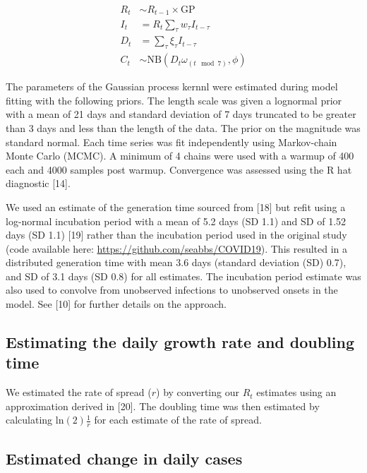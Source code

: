 \documentclass[
]{article}
\begin{document}
\begin{align}
  R_{t} &\sim R_{t-1} \times \mathrm{GP} \\
  I_t &= R_t \sum_\tau w_\tau I_{t - \tau} \\
  D_t &= \sum_\tau \xi_\tau I_{t-\tau} \\ 
  C_t &\sim \mathrm{NB}(D_t \omega_{(t \mod 7)} , \phi)
\end{align}

The parameters of the Gaussian process kernnl were estimated during
model fitting with the following priors. The length scale was given a
lognormal prior with a mean of 21 days and standard deviation of 7 days
truncated to be greater than 3 days and less than the length of the
data. The prior on the magnitude was standard normal. Each time series
was fit independently using Markov-chain Monte Carlo (MCMC). A minimum
of 4 chains were used with a warmup of 400 each and 4000 samples post
warmup. Convergence was assessed using the R hat diagnostic {[}14{]}.

We used an estimate of the generation time sourced from {[}18{]} but
refit using a log-normal incubation period with a mean of 5.2 days (SD
1.1) and SD of 1.52 days (SD 1.1) {[}19{]} rather than the incubation
period used in the original study (code available here:
\url{https://github.com/seabbs/COVID19}). This resulted in a distributed
generation time with mean 3.6 days (standard deviation (SD) 0.7), and SD
of 3.1 days (SD 0.8) for all estimates. The incubation period estimate
was also used to convolve from unobserved infections to unobserved
onsets in the model. See {[}10{]} for further details on the approach.

\hypertarget{estimating-the-daily-growth-rate-and-doubling-time}{%
\subsection{Estimating the daily growth rate and doubling
time}\label{estimating-the-daily-growth-rate-and-doubling-time}}

We estimated the rate of spread (\(r\)) by converting our \(R_t\)
estimates using an approximation derived in {[}20{]}. The doubling time
was then estimated by calculating \(\text{ln}(2) \frac{1}{r}\) for each
estimate of the rate of spread.

\hypertarget{estimated-change-in-daily-cases}{%
\subsection{Estimated change in daily
cases}\label{estimated-change-in-daily-cases}}
\end{document}
